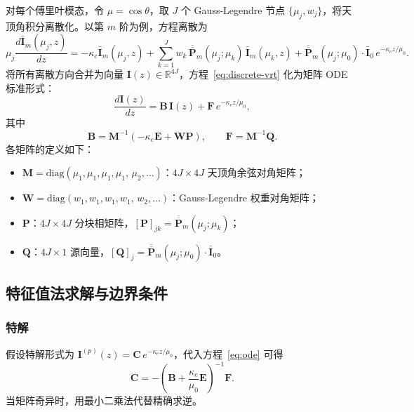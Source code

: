 \documentclass[UTF8,a4paper,12pt]{ctexart}
\begin{document}
对每个傅里叶模态，令 $\mu=\cos\theta$，取 $J$ 个 Gauss-Legendre 节点 $\{\mu_j, w_j\}$，将天顶角积分离散化。以第 $m$ 阶为例，方程离散为
\begin{equation}
  \mu_j\frac{d\bar{\mathbf{I}}_m(\mu_j,z)}{dz}
  = -\kappa_e\bar{\mathbf{I}}_m(\mu_j,z)
  + \sum_{k=1}^{J}w_k\,\overline{\overline{\mathbf{P}}}_m(\mu_j;\mu_k)\,\bar{\mathbf{I}}_m(\mu_k,z)
  + \overline{\overline{\mathbf{P}}}_m(\mu_j;\mu_0)\cdot\bar{\mathbf{I}}_0\,e^{-\kappa_e z/\mu_0}.
  \label{eq:discrete-vrt}
\end{equation}
将所有离散方向合并为向量 $\mathbf{I}(z)\in\mathbb{R}^{4J}$，方程~\eqref{eq:discrete-vrt} 化为矩阵 ODE 标准形式：
\begin{equation}
  \frac{d\mathbf{I}(z)}{dz}
  = \mathbf{B}\,\mathbf{I}(z) + \mathbf{F}\,e^{-\kappa_e z/\mu_0},
  \label{eq:ode}
\end{equation}
其中
\begin{equation}
  \mathbf{B} = \mathbf{M}^{-1}\!\left(-\kappa_e\mathbf{E}+\mathbf{W}\mathbf{P}\right),
  \qquad
  \mathbf{F} = \mathbf{M}^{-1}\mathbf{Q}.
  \label{eq:BF}
\end{equation}
各矩阵的定义如下：
\begin{itemize}[leftmargin=2em]
  \item $\mathbf{M}=\mathrm{diag}(\mu_1,\mu_1,\mu_1,\mu_1,\,\mu_2,\ldots)$：$4J\times4J$ 天顶角余弦对角矩阵；
  \item $\mathbf{W}=\mathrm{diag}(w_1,w_1,w_1,w_1,\,w_2,\ldots)$：Gauss-Legendre 权重对角矩阵；
  \item $\mathbf{P}$：$4J\times4J$ 分块相矩阵，$[\mathbf{P}]_{jk}=\overline{\overline{\mathbf{P}}}_m(\mu_j;\mu_k)$；
  \item $\mathbf{Q}$：$4J\times1$ 源向量，$[\mathbf{Q}]_j=\overline{\overline{\mathbf{P}}}_m(\mu_j;\mu_0)\cdot\bar{\mathbf{I}}_0$。
\end{itemize}

\subsection{特征值法求解与边界条件}

\subsubsection{特解}
假设特解形式为 $\mathbf{I}^{(p)}(z)=\mathbf{C}\,e^{-\kappa_e z/\mu_0}$，代入方程~\eqref{eq:ode} 可得
\begin{equation}
  \mathbf{C} = -\!\left(\mathbf{B}+\frac{\kappa_e}{\mu_0}\mathbf{E}\right)^{-1}\!\mathbf{F}.
  \label{eq:particular}
\end{equation}
当矩阵奇异时，用最小二乘法代替精确求逆。
\end{document}
